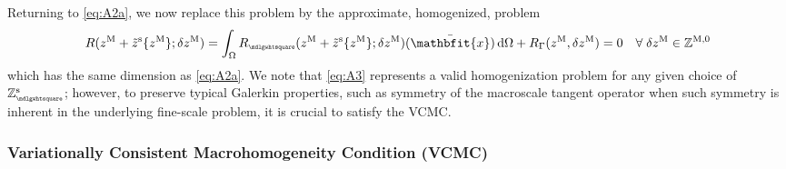 \documentclass[12pt,a4paper]{article}
\renewcommand{\ta}[1]{\mathbfit{#1}}
\renewcommand{\Box}{\mdlgwhtsquare}
\newcommand{\rve}{
  {\mathchoice
   {\mbox{\scalebox{0.67}{$\Box$}}}
   {\mbox{\scalebox{0.67}{$\Box$}}}
   {\mbox{\scalebox{0.5}{$\Box$}}}
   {\mbox{\scalebox{0.375}{$\Box$}}}
  }
}
\begin{document}
Returning to \cref{eq:A2a}, we now replace this problem by the approximate, homogenized, problem
\begin{align}
\label{eq:A3} R(z^\macro+\tilde{z}^\fluct\{z^\macro\};\delta z^\macro) = \int_\Omega R_\rve(z^\macro+\tilde{z}^\fluct\{z^\macro\};\delta z^\macro)(\bar{\ta x})\dif\Omega
 + R_\Gamma(z^\macro, \delta z^\macro) = 0 \quad \forall\;\delta z^\macro \in \set Z^{\macro,0}
\end{align}
which has the same dimension as \cref{eq:A2a}.
We note that \cref{eq:A3} represents a valid homogenization problem for any given choice of $\set{Z}_\rve^{\fluct}$; however, to preserve typical Galerkin properties, such as symmetry of the macroscale tangent operator when such symmetry is inherent in the underlying fine-scale problem, it is crucial to satisfy the VCMC.

\subsubsection{Variationally Consistent Macrohomogeneity Condition (VCMC)}
\end{document}
